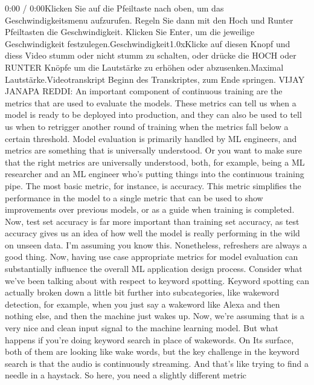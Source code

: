 {{{{     0:00 / 0:00Klicken Sie auf die Pfeiltaste nach oben, um das Geschwindigkeitsmenu aufzurufen. Regeln Sie dann mit den Hoch und Runter Pfeiltasten die Geschwindigkeit. Klicken Sie Enter, um die jeweilige Geschwindigkeit festzulegen.Geschwindigkeit1.0xKlicke auf diesen Knopf und diess Video stumm oder nicht stumm zu schalten, oder drücke die HOCH oder RUNTER Knöpfe um die Lautstärke zu erhöhen oder abzusenken.Maximal Lautstärke.Videotranskript
     Beginn des Transkriptes, zum Ende springen.
     VIJAY JANAPA REDDI: An important component of continuous training
     are the metrics that are used to evaluate the models.
     These metrics can tell us when a model is
     ready to be deployed into production, and they can also
     be used to tell us when to retrigger another round of training
     when the metrics fall below a certain threshold.
     Model evaluation is primarily handled by ML engineers,
     and metrics are something that is universally understood.
     Or you want to make sure that the right metrics are universally
     understood, both, for example, being a ML researcher
     and an ML engineer who's putting things into the continuous training pipe.
     The most basic metric, for instance, is accuracy.
     This metric simplifies the performance in the model
     to a single metric that can be used to show improvements over previous models,
     or as a guide when training is completed.
     Now, test set accuracy is far more important than training set accuracy,
     as test accuracy gives us an idea of how well the model is really performing
     in the wild on unseen data.
     I'm assuming you know this.
     Nonetheless, refreshers are always a good thing.
     Now, having use case appropriate metrics for model evaluation
     can substantially influence the overall ML application design process.
     Consider what we've been talking about with respect to keyword spotting.
     Keyword spotting can actually broken down a little bit further
     into subcategories, like wakeword detection,
     for example, when you just say a wakeword like Alexa
     and then nothing else, and then the machine just wakes up.
     Now, we're assuming that is a very nice and clean input
     signal to the machine learning model.
     But what happens if you're doing keyword search in place of wakewords.
     On Its surface, both of them are looking like wake words,
     but the key challenge in the keyword search
     is that the audio is continuously streaming.
     And that's like trying to find a needle in a haystack.
     So here, you need a slightly different metric
}}}}
